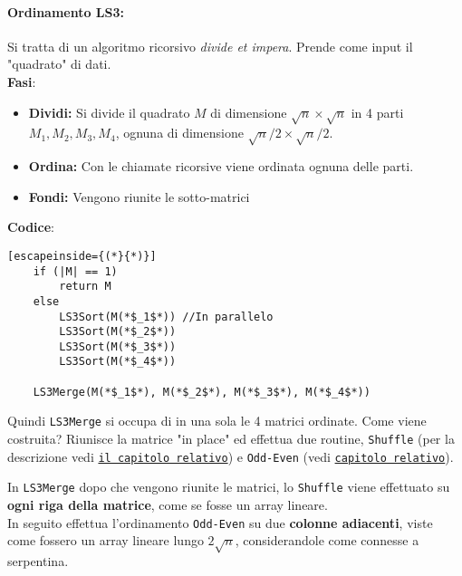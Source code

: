 \paragraph{Ordinamento LS3:} Si tratta di un algoritmo ricorsivo \textit{divide et impera}. Prende come input il "quadrato" di dati.\\

\textbf{Fasi}: 
\begin{itemize}
	\item \textbf{Dividi:} Si divide il quadrato $M$ di dimensione $\sqrt{n} \times \sqrt{n}$ in 4 parti $M_1, M_2, M_3, M_4$, ognuna di dimensione $\sqrt{n}/2 \times \sqrt{n}/2$.\\
	
	\item \textbf{Ordina:} Con le chiamate ricorsive viene ordinata ognuna delle parti.\\
	
	\item \textbf{Fondi:} Vengono riunite le sotto-matrici
\end{itemize}

\textbf{Codice}: 

\begin{lstlisting}[escapeinside={(*}{*)}]
	if (|M| == 1)
		return M
	else 
		LS3Sort(M(*$_1$*)) //In parallelo
		LS3Sort(M(*$_2$*))
		LS3Sort(M(*$_3$*))
		LS3Sort(M(*$_4$*))
		
	LS3Merge(M(*$_1$*), M(*$_2$*), M(*$_3$*), M(*$_4$*))
\end{lstlisting}

Quindi \texttt{LS3Merge} si occupa di in una sola le 4 matrici ordinate. Come viene costruita? Riunisce la matrice "in place" ed effettua due routine, \texttt{Shuffle} (per la descrizione vedi \hyperref[subsec:shuffle]{\texttt{il capitolo relativo}}) e \texttt{Odd-Even} (vedi \hyperref[subsec:ordinamento]{\texttt{capitolo relativo}}).\\

\newpage

In \texttt{LS3Merge} dopo che vengono riunite le matrici, lo \texttt{Shuffle} viene effettuato su \textbf{ogni riga della matrice}, come se fosse un array lineare.\\

In seguito effettua l'ordinamento \texttt{Odd-Even} su due \textbf{colonne adiacenti}, viste come fossero un array lineare lungo $2 \sqrt{n}$, considerandole come connesse a serpentina.\\

